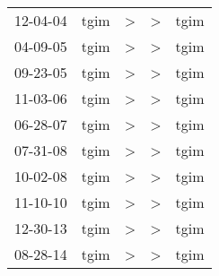 \begin{supertabular}{lllll}
 12-04-04 &  tgim &  \textgreater &  \textgreater &  tgim \\
 04-09-05 &  tgim &  \textgreater &  \textgreater &  tgim \\
 09-23-05 &  tgim &  \textgreater &  \textgreater &  tgim \\
 11-03-06 &  tgim &  \textgreater &  \textgreater &  tgim \\
 06-28-07 &  tgim &  \textgreater &  \textgreater &  tgim \\
 07-31-08 &  tgim &  \textgreater &  \textgreater &  tgim \\
 10-02-08 &  tgim &  \textgreater &  \textgreater &  tgim \\
 11-10-10 &  tgim &  \textgreater &  \textgreater &  tgim \\
 12-30-13 &  tgim &  \textgreater &  \textgreater &  tgim \\
 08-28-14 &  tgim &  \textgreater &  \textgreater &  tgim \\
\end{supertabular}
